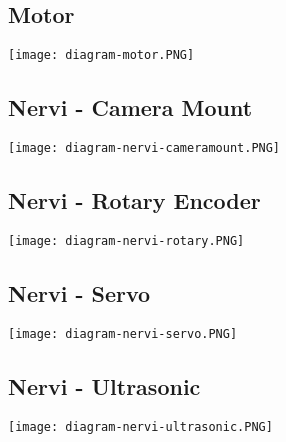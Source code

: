 \newpage
\subsection{Motor}
\texttt{[image: diagram-motor.PNG]}

\newpage
\subsection{Nervi - Camera Mount}
\texttt{[image: diagram-nervi-cameramount.PNG]}

\subsection{Nervi - Rotary Encoder}
\texttt{[image: diagram-nervi-rotary.PNG]}

\subsection{Nervi - Servo}
\texttt{[image: diagram-nervi-servo.PNG]}

\subsection{Nervi - Ultrasonic}
\texttt{[image: diagram-nervi-ultrasonic.PNG]}

